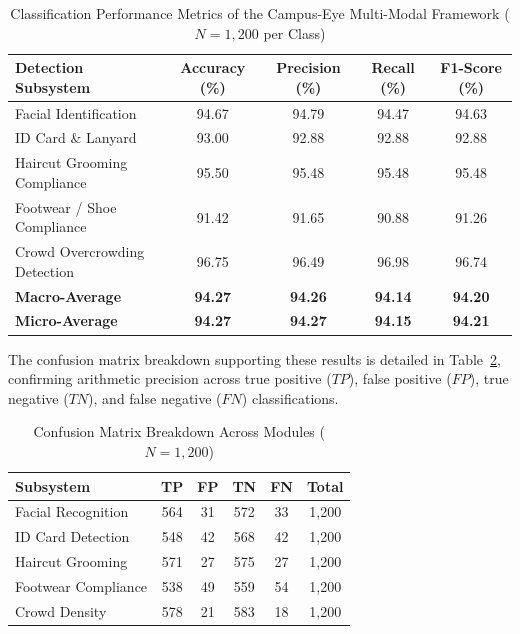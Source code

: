 \documentclass[conference]{IEEEtran}
\begin{document}
\begin{table}[htbp]
\centering
\caption{Classification Performance Metrics of the Campus-Eye Multi-Modal Framework ($N = 1,200$ per Class)}
\label{tab:performance_metrics}
\begin{tabular}{lcccc}
\toprule
\textbf{Detection Subsystem} & \textbf{Accuracy (\%)} & \textbf{Precision (\%)} & \textbf{Recall (\%)} & \textbf{F1-Score (\%)} \\
\midrule
Facial Identification         & 94.67 & 94.79 & 94.47 & 94.63 \\
ID Card \& Lanyard            & 93.00 & 92.88 & 92.88 & 92.88 \\
Haircut Grooming Compliance   & 95.50 & 95.48 & 95.48 & 95.48 \\
Footwear / Shoe Compliance    & 91.42 & 91.65 & 90.88 & 91.26 \\
Crowd Overcrowding Detection  & 96.75 & 96.49 & 96.98 & 96.74 \\
\midrule
\textbf{Macro-Average}        & \textbf{94.27} & \textbf{94.26} & \textbf{94.14} & \textbf{94.20} \\
\textbf{Micro-Average}        & \textbf{94.27} & \textbf{94.27} & \textbf{94.15} & \textbf{94.21} \\
\bottomrule
\end{tabular}
\end{table}

The confusion matrix breakdown supporting these results is detailed in Table~\ref{tab:confusion_matrix}, confirming arithmetic precision across true positive ($TP$), false positive ($FP$), true negative ($TN$), and false negative ($FN$) classifications.

\begin{table}[htbp]
\centering
\caption{Confusion Matrix Breakdown Across Modules ($N = 1,200$)}
\label{tab:confusion_matrix}
\begin{tabular}{lccccc}
\toprule
\textbf{Subsystem} & \textbf{TP} & \textbf{FP} & \textbf{TN} & \textbf{FN} & \textbf{Total} \\
\midrule
Facial Recognition    & 564 & 31 & 572 & 33 & 1,200 \\
ID Card Detection     & 548 & 42 & 568 & 42 & 1,200 \\
Haircut Grooming      & 571 & 27 & 575 & 27 & 1,200 \\
Footwear Compliance   & 538 & 49 & 559 & 54 & 1,200 \\
Crowd Density         & 578 & 21 & 583 & 18 & 1,200 \\
\bottomrule
\end{tabular}
\end{table}
\end{document}
